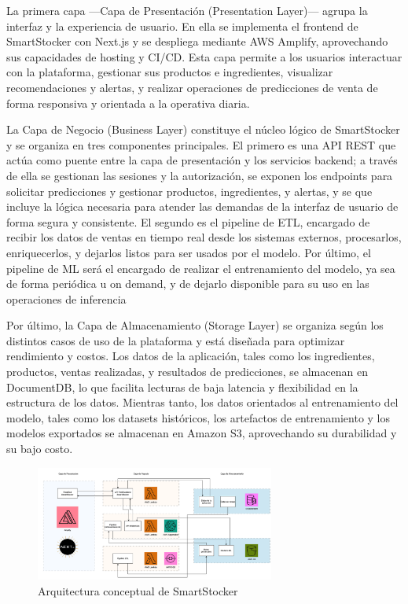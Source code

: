 La primera capa —Capa de Presentación (Presentation Layer)— agrupa la interfaz y la experiencia de usuario. En ella se implementa el frontend de SmartStocker con Next.js y se despliega mediante AWS Amplify, aprovechando sus capacidades de hosting y CI/CD. Esta capa permite a los usuarios interactuar con la plataforma, gestionar sus productos e ingredientes, visualizar recomendaciones y alertas, y realizar operaciones de predicciones de venta de forma responsiva y orientada a la operativa diaria.

La Capa de Negocio (Business Layer) constituye el núcleo lógico de SmartStocker y se organiza en tres componentes principales. El primero es una API REST que actúa como puente entre la capa de presentación y los servicios backend; a través de ella se gestionan las sesiones y la autorización, se exponen los endpoints para solicitar predicciones y gestionar productos, ingredientes, y alertas, y se que incluye la lógica necesaria para atender las demandas de la interfaz de usuario de forma segura y consistente. El segundo es el pipeline de ETL, encargado de recibir los datos de ventas en tiempo real desde los sistemas externos, procesarlos, enriquecerlos, y dejarlos listos para ser usados por el modelo. Por último, el pipeline de ML será el encargado de realizar el entrenamiento del modelo, ya sea de forma periódica u on demand, y de dejarlo disponible para su uso en las operaciones de inferencia 

Por último, la Capa de Almacenamiento (Storage Layer) se organiza según los distintos casos de uso de la plataforma y está diseñada para optimizar rendimiento y costos. Los datos de la aplicación, tales como los ingredientes, productos, ventas realizadas,  y resultados de predicciones, se almacenan en DocumentDB, lo que facilita lecturas de baja latencia y flexibilidad en la estructura de los datos. Mientras tanto, los datos orientados al entrenamiento del modelo, tales como los datasets históricos, los artefactos de entrenamiento y los modelos exportados se almacenan en Amazon S3, aprovechando su durabilidad y su bajo costo.

\begin{figure}[htbp]
    \centering
    \includegraphics[width=0.7\textwidth]{images/arquitectura_capas.png}
    \caption{Arquitectura conceptual de SmartStocker}
    \label{fig:arquitectura-conceptual}
\end{figure}

